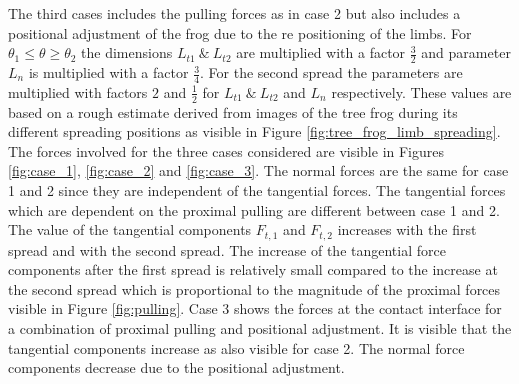 \qquad The third cases includes the pulling forces as in case 2 but also includes a positional adjustment of the frog due to the re positioning of the limbs. For $\theta_{1} \leq \theta \geq \theta_2$ the dimensions $L_{t1}\ \&\ L_{t2}$ are multiplied with a factor $\frac{3}{2}$ and parameter $L_{n}$ is multiplied with a factor $\frac{3}{4}$. For the second spread the parameters are multiplied with factors $2$ and $\frac{1}{2}$ for $L_{t1}\ \&\  L_{t2}$ and $L_{n}$ respectively. These values are based on a rough estimate derived from images of the tree frog during its different spreading positions as visible in Figure \ref{fig:tree_frog_limb_spreading}.\\


\qquad The forces involved  for the three cases considered are visible in Figures \ref{fig:case_1}, \ref{fig:case_2} and \ref{fig:case_3}. The normal forces are the same for case 1 and 2 since they are independent of the tangential forces. The tangential forces which are dependent on the proximal pulling are different between case 1 and 2. The value of the tangential components $F_{t,1}$ and $F_{t,2}$ increases with the first spread and with the second spread. The increase of the tangential force components after the first spread is relatively small compared to the increase at the second spread which is proportional to the magnitude of the proximal forces visible in Figure \ref{fig:pulling}. Case 3 shows the forces at the contact interface for a combination of proximal pulling and positional adjustment. It is visible that the tangential components increase as also visible for case 2. The normal force components decrease due to the positional adjustment.\\


